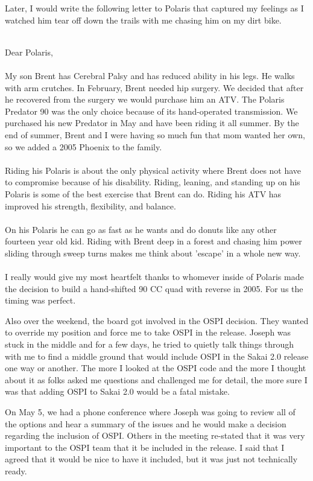 \documentclass[12pt]{book}
\begin{document}
Later, I would write the following letter to Polaris
that captured my feelings as I watched him tear
off down the trails with me chasing him on my
dirt bike.\\
\\
\begin{sf}
Dear Polaris,\\
\\
My son Brent has Cerebral Palsy and has reduced ability
in his legs. He walks with arm crutches. In February,
Brent needed hip surgery. We decided that after he
recovered from the surgery we would purchase him an
ATV. The Polaris Predator 90 was the only choice because
of its hand-operated transmission. We purchased his new
Predator in May and have been riding it all summer.
By the end of summer, Brent and I were having so much
fun that mom wanted her own, so we added a 2005 Phoenix
to the family.\\
\\
Riding his Polaris is about the only physical activity
where Brent does not have to compromise because of
his disability. Riding, leaning, and standing up on
his Polaris is some of the best exercise that Brent
can do. Riding his ATV has improved his strength,
flexibility, and balance.\\
\\
On his Polaris he can go as fast as he wants and do
donuts like any other fourteen year old kid. Riding
with Brent deep in a forest and chasing him power sliding
through sweep turns makes me think about 'escape' in
a whole new way.\\
\\
I really would give my most heartfelt thanks to whomever
inside of Polaris made the decision to build a
hand-shifted 90 CC quad with reverse in 2005. For us
the timing was perfect.\\
\end{sf}

Also over the weekend, the board got involved
in the OSPI decision.  They wanted to override
my position and force me to take OSPI in the release.
Joseph was stuck in the middle and for a few days,
he tried to quietly
talk things through with me to find a middle
ground that would include OSPI in the Sakai 2.0
release one way or another.
The more I looked at the OSPI code and the more
I thought about it as folks asked me questions
and challenged me for detail, the more sure I was
that adding OSPI to Sakai 2.0 would be a fatal
mistake.

On May 5, we had a phone conference where Joseph
was going to review all of the options and
hear a summary of the issues and he would make a
decision regarding the inclusion of OSPI.
Others in the meeting re-stated that
it was very important to the OSPI team that
it be included in the release.   I said that
I agreed that it would be nice to have it included,
but it was just not technically ready.
\end{document}
